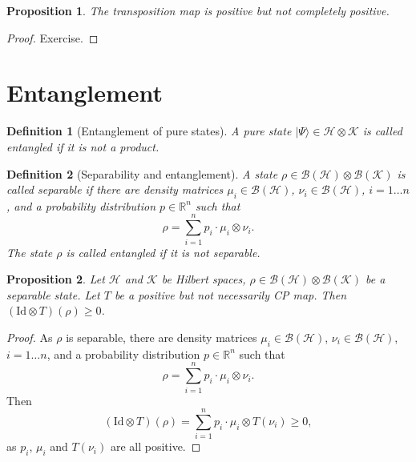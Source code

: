 \documentclass{article}
\newtheorem{proposition}{Proposition}
\newtheorem{definition}{Definition}
\theoremstyle{definition}
\newcommand{\id}{\mathrm{Id}}
\newcommand{\ket}[1]{\vert #1 \rangle}
\newcommand{\bounded}[1]{\mathcal{B}(#1)}
\begin{document}
\begin{proposition}
  The transposition map is positive but not completely positive.
\end{proposition}
\begin{proof}
  Exercise.
\end{proof}

\section{Entanglement}

\begin{definition}[Entanglement of pure states]
  A pure state $\ket{\Psi}\in \mathcal{H}\otimes\mathcal{K}$ is called entangled if it is not a product.
\end{definition}

\begin{definition}[Separability and entanglement]
  A state $\rho \in \bounded{\mathcal{H}} \otimes \bounded{\mathcal{K}}$ is called \emph{separable} if there are density matrices $\mu_i\in \bounded{\mathcal{H}}$, $\nu_i\in\bounded{\mathcal{H}}$, $i=1\dots n$, and a probability distribution $p\in\mathbb{R}^n$ such that
  \begin{equation*}
    \rho = \sum_{i=1}^n p_i \cdot \mu_i \otimes \nu_i.    
  \end{equation*}
  The state $\rho$ is called \emph{entangled} if it is not separable.
\end{definition}

\begin{proposition}
  Let $\mathcal{H}$ and $\mathcal{K}$ be Hilbert spaces, $\rho\in\bounded{\mathcal{H}}\otimes\bounded{\mathcal{K}}$ be a \emph{separable} state.  Let $T$ be a positive but not necessarily CP map. Then $(\id\otimes T)(\rho)\geq 0$.
\end{proposition}
\begin{proof}
  As $\rho$ is separable, there are density matrices $\mu_i\in \bounded{\mathcal{H}}$, $\nu_i\in\bounded{\mathcal{H}}$, $i=1\dots n$, and a probability distribution $p\in\mathbb{R}^n$ such that
    \begin{equation*}
      \rho = \sum_{i=1}^n p_i \cdot \mu_i \otimes \nu_i.    
    \end{equation*}
    Then 
    \begin{equation*}
      (\id\otimes T)(\rho) = \sum_{i=1}^n p_i \cdot \mu_i \otimes T(\nu_i) \geq 0,    
    \end{equation*}
    as $p_i$, $\mu_i$ and $T(\nu_i)$ are all positive.
\end{proof}
\end{document}
